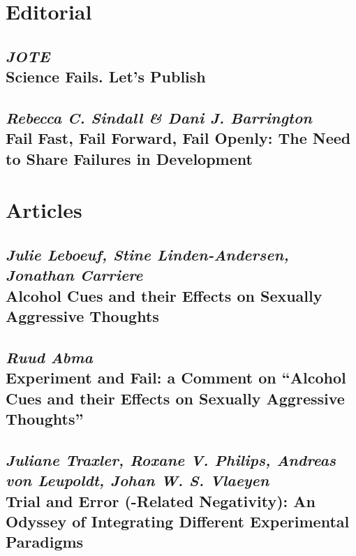 \documentclass{book}
\begin{document}
\frontmatter
\setcounter{page}{1}
\tableofcontents
\mainmatter

\newpage
\thispagestyle{empty}
\mbox{}
\newpage
\newpage
\newpage

\part{Editorial}

\renewcommand{\chaptername}{Devine}
\chapter{\textit{JOTE}\\Science Fails. Let's Publish}
\setcounter{page}{1}

\chapter{\textit{Rebecca C. Sindall \& Dani J. Barrington}\\ Fail Fast, Fail Forward, Fail Openly: The Need to Share Failures in Development}
\setcounter{page}{6}


\part{Articles}
\newpage\setcounter{page}{9}
\chapter{\textit{Julie Leboeuf,  Stine Linden-Andersen,  Jonathan Carriere}\\ Alcohol Cues and their Effects on Sexually Aggressive Thoughts}


\newpage\setcounter{page}{20}
\chapter{\textit{Ruud Abma}\\ Experiment and Fail: a Comment on “Alcohol Cues and their Effects on Sexually Aggressive Thoughts”}


\newpage\setcounter{page}{27}
\chapter{\textit{Juliane Traxler,  Roxane V. Philips,  Andreas von Leupoldt, Johan W. S. Vlaeyen}\\ Trial and Error (-Related Negativity): An Odyssey of Integrating Different Experimental Paradigms}
\end{document}
